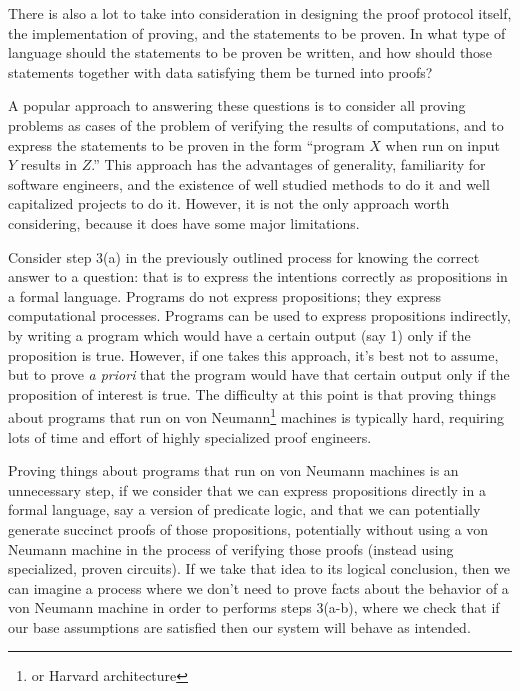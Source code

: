 \documentclass[11pt]{article}
\begin{document}
There is also a lot to take into consideration in designing the proof protocol itself,
the implementation of proving, and the statements to be proven. In what type of language
should the statements to be proven be written, and how should those statements together
with data satisfying them be turned into proofs?

A popular approach to answering these questions is to consider all proving problems
as cases of the problem of verifying the results of computations, and to express the
statements to be proven in the form ``program $X$ when run on input $Y$ results in $Z$.''
This approach has the advantages of generality, familiarity for software engineers, and the
existence of well studied methods to do it and well capitalized projects to do it.
However, it is not the only approach worth considering, because it does have some
major limitations. 

Consider step 3(a) in the previously outlined process for knowing the correct answer
to a question: that is to express the intentions correctly as propositions in a formal
language. Programs do not express propositions; they express computational processes.
Programs can be used to express propositions indirectly, by writing a program which
would have a certain output (say 1) only if the proposition is true. However, if one
takes this approach, it's best not to assume, but to prove \emph{a priori}\/ that
the program would have that certain output only if the proposition of interest is true.
The difficulty at this point is that proving things about programs that run on von
Neumann\footnote{or Harvard architecture} machines is typically hard, requiring
lots of time and effort of highly specialized proof engineers.

Proving things about programs that run on von Neumann machines is an unnecessary step,
if we consider that we can express propositions directly in a formal language, say a
version of predicate logic, and that we can potentially generate succinct proofs of
those propositions, potentially without using a von Neumann machine in the process
of verifying those proofs (instead using specialized, proven circuits). If we take
that idea to its logical conclusion, then we can imagine a process where we don't need
to prove facts about the behavior of a von Neumann machine in order to performs steps
3(a-b), where we check that if our base assumptions are satisfied then our system
will behave as intended.
\end{document}
